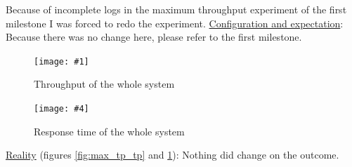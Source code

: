 \documentclass[11pt]{article}
\newcommand\TwoFig[6]{%
	\sbox\IBoxA{\texttt{[image: \#1]}}
	\sbox\IBoxB{\texttt{[image: \#4]}}%
	\ifdim\ht\IBoxA>\ht\IBoxB
	\setlength\IHeight{\ht\IBoxB}\else\setlength\IHeight{\ht\IBoxA}\fi%
	\begin{figure}[!htb]
		\minipage[t]{0.5\textwidth}\centering
		\texttt{[image: \#1]}
		\caption{#2}\label{#3}
		\endminipage \hfill
		\minipage[t]{0.5\textwidth}\centering
		\texttt{[image: \#4]}
		\caption{#5}\label{#6}
		\endminipage
	\end{figure}%
}
\begin{document}
Because of incomplete logs in the maximum throughput experiment of the first milestone I was forced to redo the experiment.
\newline\underline{Configuration and expectation}: Because there was no change here, please refer to the first milestone.
\TwoFig	{figures/max_tp_2/tp} {Throughput of the whole system} {fig:max_tp_tp}
		{figures/max_tp_2/rt} {Response time of the whole system} {fig:max_tp_rt}
\newline\underline{Reality} (figures \ref{fig:max_tp_tp} and \ref{fig:max_tp_rt}): Nothing did change on the outcome.
\end{document}
